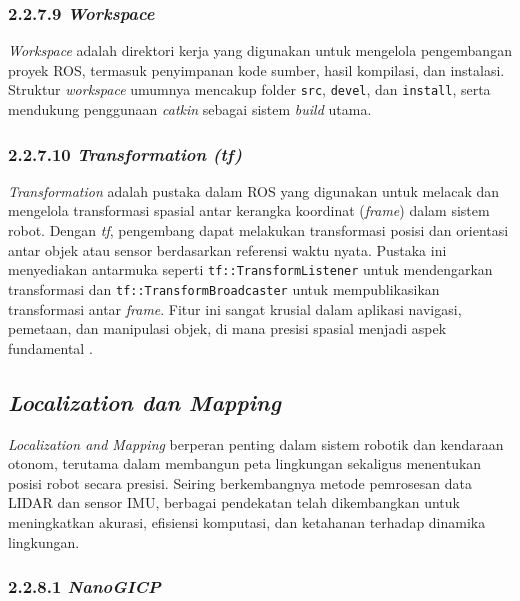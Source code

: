 \subsubsection{2.2.7.9 \emph{Workspace}}
\emph{Workspace} adalah direktori kerja yang digunakan untuk mengelola pengembangan proyek ROS, termasuk penyimpanan kode sumber, hasil kompilasi, dan instalasi. Struktur \emph{workspace} umumnya mencakup folder \texttt{src}, \texttt{devel}, dan \texttt{install}, serta mendukung penggunaan \emph{catkin} sebagai sistem \emph{build} utama.

\subsubsection{2.2.7.10 \emph{Transformation (tf)}}
\emph{Transformation} adalah pustaka dalam ROS yang digunakan untuk melacak dan mengelola transformasi spasial antar kerangka koordinat (\emph{frame}) dalam sistem robot. Dengan \emph{tf}, pengembang dapat melakukan transformasi posisi dan orientasi antar objek atau sensor berdasarkan referensi waktu nyata. Pustaka ini menyediakan antarmuka seperti \texttt{tf::TransformListener} untuk mendengarkan transformasi dan \texttt{tf::TransformBroadcaster} untuk mempublikasikan transformasi antar \emph{frame}. Fitur ini sangat krusial dalam aplikasi navigasi, pemetaan, dan manipulasi objek, di mana presisi spasial menjadi aspek fundamental \cite{ros_noetic}.

\subsection{\emph{Localization dan Mapping}}

 \textit{ Localization and Mapping} berperan penting dalam sistem robotik dan kendaraan otonom, terutama dalam membangun peta lingkungan sekaligus menentukan posisi robot secara presisi. Seiring berkembangnya metode pemrosesan data LIDAR dan sensor IMU, berbagai pendekatan telah dikembangkan untuk meningkatkan akurasi, efisiensi komputasi, dan ketahanan terhadap dinamika lingkungan. 

\subsubsection{2.2.8.1 \emph{NanoGICP}}


